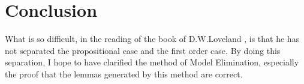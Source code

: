\documentclass{article}
\begin{document}
\section*{Conclusion}
What is so difficult, in the reading of the book of D.W.Loveland \cite{Loveland1997}, is that he has not separated the 
propositional case and the first order case. By doing this separation, I hope to have clarified the method of Model 
Elimination, especially the proof that the lemmas generated by this method are correct.










\end{document}
